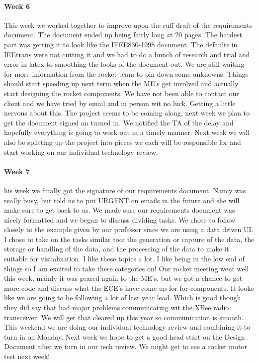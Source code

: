 \documentclass[10pt,draftclsnofoot,onecolumn,retainorgcmds]{IEEEtran}
\begin{document}
\paragraph{Week 6}
This week we worked together to improve upon the ruff draft of the requirements document. The document ended up being fairly long at 20 pages. The hardest part was getting it to look like the IEEE830-1998 document. The defaults in IEEtrans were not cutting it and we had to do a bunch of research and trial and error in latex to smoothing the looks of the document out. We are still waiting for more information from the rocket team to pin down some unknowns. Things should start speeding up next term when the ME's get involved and actually start designing the rocket components. We have not been able to contact our client and we have tried by email and in person wit no luck. Getting a little nervous about this. The project seems to be coming along, next week we plan to get the document signed an turned in. We notified the TA of the delay and hopefully everything is going to work out in a timely manner. Next week we will also be splitting up the project into pieces we each will be responsible for and start working on our individual technology review.\\
\paragraph{Week 7}
his week we finally got the signature of our requirements document. Nancy was really busy, but told us to put URGENT on emails in the future and she will make sure to get back to us. We made sure our requirements document was nicely formatted and we began to discuss dividing tasks. We chose to follow closely to the example given by our professor since we are using a data driven UI. I chose to take on the tasks similar too: the generation or capture of the data, the storage or handling of the data, and the processing of the data to make it suitable for visualization. I like these topics a lot. I like being in the low end of things so I am excited to take these categories on! Our rocket meeting went well this week, mainly it was geared again to the ME's, but we got a chance to get more code and discuss what the ECE's have come up for for components. It looks like we are going to be following a lot of last year lead. Which is good though they did say that had major problems communicating wit the XBee radio transceiver. We will get that cleared up this year so communication is smooth. This weekend we are doing our individual technology review and combining it to turn in on Monday. Next week we hope to get a good head start on the Design Document after we turn in our tech review. We might get to see a rocket motor test next week!\\
\end{document}
